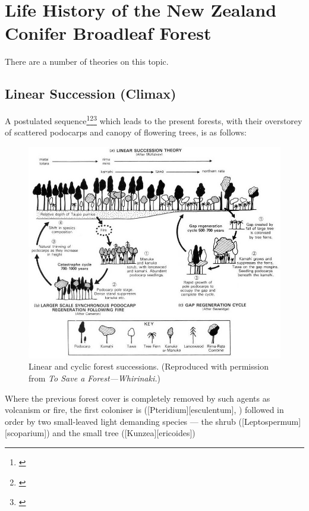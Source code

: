 \section{Life History of the New Zealand Conifer Broadleaf Forest}

There are a number of theories on this topic.

\subsection[Linear Succession (Climax)]{Linear Succession (Climax)}


A postulated sequence\footnote{\cite{cockayne1928vegetation}}\footnote{\cite{mckelvey1963synecology}}\footnote{\cite{mckelvey1973pattern}} which leads to the present forests, with their overstorey of scattered podocarps and canopy of flowering trees, is as follows:

\begin{figure}[!b]
	\centering
	\includegraphics[width=\textwidth]{graphics/fig_064}
	\caption[Linear and cyclic forest successions]{Linear and cyclic forest successions. (Reproduced with permission from \emph{To Save a Forest---Whirinaki.})}%
	\label{fig:64forestsuccession}
\end{figure}

Where the previous forest cover is completely removed by such agents as volcanism or fire, the first coloniser is  ([Pteridium][esculentum], ) followed in order by two small-leaved light demanding species --- the shrub  ([Leptospermum][scoparium]) and the small tree  ([Kunzea][ericoides])

